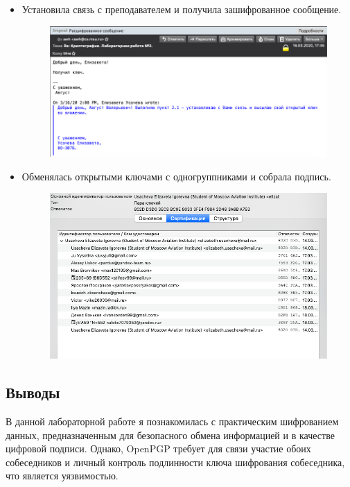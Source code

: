 \documentclass[12pt]{article}
\begin{document}
\begin{itemize}
    \item Установила связь с преподавателем и получила зашифрованное сообщение.
    \begin{figure}[h]
        \centering
        \includegraphics[width=0.8\linewidth]{1.png}
    \end{figure}
    \item Обменялась открытыми ключами с одногруппниками и собрала подпись.  \begin{figure}[h]
        \centering
        \includegraphics[width=0.8\linewidth]{2.png}
    \end{figure}
\end{itemize}
    
\subsection*{Выводы}

В данной лабораторной работе я познакомилась с практическим шифрованием данных, предназначенным для безопасного обмена информацией и в качестве цифровой подписи. Однако, OpenPGP требует для связи участие обоих собеседников и личный контроль подлинности ключа шифрования собеседника, что является уязвимостью. 
\end{document}
